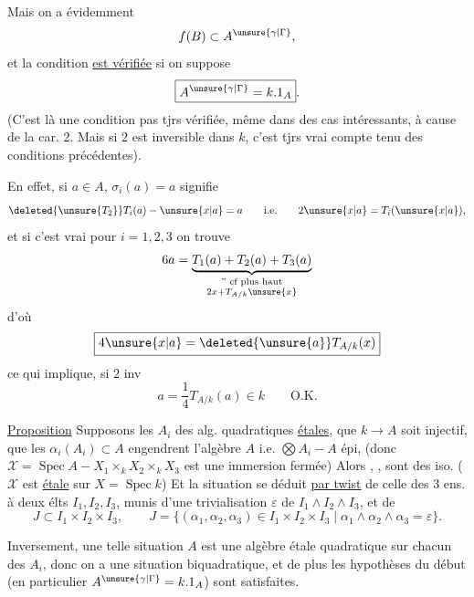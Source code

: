 Mais on a évidemment
\[
 f(B)\subset A^{\unsure{\gamma|\Gamma}},
\]
et la condition \uline{est vérifiée} si on suppose
\[
 \boxed{A^{\unsure{\gamma|\Gamma}}=k.1_A}.
\]
(C'est là une condition pas tjrs vérifiée, même dans des cas intéressants, à cause de la car. 2. Mais si $2$ est inversible dans $k$, c'est tjrs vrai compte tenu des conditions précédentes).

En effet, si $a\in A$, $\sigma_i(a)=a$ signifie
\[
 \deleted{\unsure{T_2}}T_i(a)-\unsure{x|a}=a\qquad\text{i.e.}\qquad2\unsure{x|a}=T_i(\unsure{x|a}),
\]
et si c'est vrai pour $i=1,2,3$ on trouve
\[
 6a=\underbrace{T_1(a)+T_2(a)+T_3(a)}_{\substack{\text{'' cf plus haut}\\2x+T_{A/k}\unsure{x}}}
\]
d'où
\[
 \boxed{4\unsure{x|a}=\deleted{\unsure{a}}T_{A/k}(x)}
\]
ce qui implique, si $2$ inv
\[
 a=\frac14T_{A/k}(a)\in k\qquad\text{O.K.}
\]

\uline{Proposition} Supposons les $A_i$ des alg. quadratiques \uline{étales}, que $k\longrightarrow A$ soit injectif, que les $\alpha_i(A_i)\subset A$ engendrent l'algèbre $A$ i.e. $\bigotimes A_i\mathbin{-}A$ épi,
(donc $\mathcal X=\operatorname{Spec}A\mathbin{-}X_1\times_k X_2\times_k X_3$ est une immersion fermée) 
Alors 
,
,
sont des iso. ( $\mathcal X$ est  \uline{étale} sur $X=\operatorname{Spec}k$)
Et la situation se déduit \uline{par twist} de celle des 3 ens. à deux élts  $I_1,I_2,I_3$, munis d'une trivialisation $\varepsilon$ de $I_1\wedge I_2\wedge I_3$, et de
\[
 J\subset I_1\times I_2\times I_3,\qquad J=\{(\alpha_1,\alpha_2,\alpha_3)\in I_1\times I_2\times I_3\mid\alpha_1\wedge\alpha_2\wedge\alpha_3=\varepsilon\}.
\]

Inversement,  une telle situation  $A$ est une algèbre étale quadratique sur chacun des $A_i$, donc on a une situation biquadratique, et de plus les hypothèses du début (en particulier $A^{\unsure{\gamma|\Gamma}}=k.1_A$) sont satisfaites.

